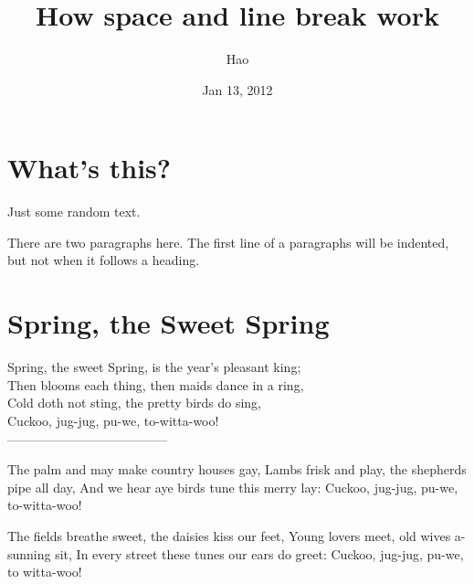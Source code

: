 \documentclass[a4paper,10pt]{article}
\title{How space and line break work}
\author{Hao}
\date{Jan 13, 2012}
\begin{document}
\maketitle

\begin{abstract}

\end{abstract}

\section{What's this?}
Just   some    random
text.

There are two paragraphs here. 
The first line of a paragraphs will be indented, but not when it follows a heading.

\section{Spring, the Sweet Spring}

Spring, the sweet Spring, is the year's pleasant king; \\[1cm]
Then blooms each thing, then maids dance in a ring, \\[1.5cm]
Cold doth not sting, the pretty birds do sing, \\[2cm]
Cuckoo, jug-jug, pu-we, to-witta-woo!\\
--------------------------------------

\noindent
The palm and may make country houses gay, \linebreak
Lambs frisk and play, the shepherds pipe all day, \linebreak
And we hear aye birds tune this merry lay: \linebreak
Cuckoo, jug-jug, pu-we, to-witta-woo!\linebreak

\noindent
The fields breathe sweet, the daisies kiss our feet, \newline
Young lovers meet, old wives a-sunning sit, \newline
In every street these tunes our ears do greet: \newline
Cuckoo, jug-jug, pu-we, to witta-woo! 
\end{document}
